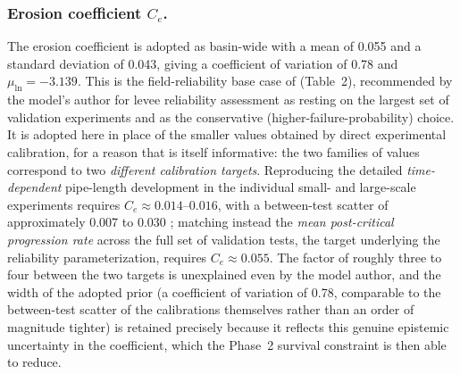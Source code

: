 \subsubsection*{Erosion coefficient $C_e$.}
The erosion coefficient is adopted as basin-wide with a mean of 0.055 and a standard deviation of 0.043, giving a coefficient of variation of 0.78 and $\mu_{\ln} = -3.139$. This is the field-reliability base case of \textcite{pol_sie_2024} (Table~2), recommended by the model's author for levee reliability assessment as resting on the largest set of validation experiments and as the conservative (higher-failure-probability) choice. It is adopted here in place of the smaller values obtained by direct experimental calibration, for a reason that is itself informative: the two families of values correspond to two \emph{different calibration targets}. Reproducing the detailed \emph{time-dependent} pipe-length development in the individual small- and large-scale experiments requires $C_e \approx 0.014$--$0.016$, with a between-test scatter of approximately 0.007 to 0.030 \parencite{pol_compgeo_2024}; matching instead the \emph{mean post-critical progression rate} across the full set of validation tests, the target underlying the reliability parameterization, requires $C_e \approx 0.055$. The factor of roughly three to four between the two targets is unexplained even by the model author, and the width of the adopted prior (a coefficient of variation of 0.78, comparable to the between-test scatter of the calibrations themselves rather than an order of magnitude tighter) is retained precisely because it reflects this genuine epistemic uncertainty in the coefficient, which the Phase~2 survival constraint is then able to reduce.


